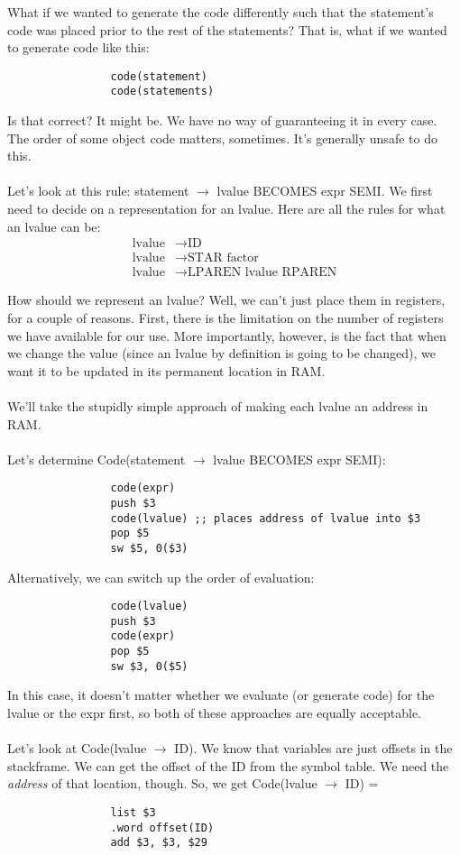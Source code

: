 \documentclass[]{article}
\theoremstyle{definition}
\begin{document}
				What if we wanted to generate the code differently such that the statement's code was placed prior to the rest of the statements? That is, what if we wanted to generate code like this:
				\begin{verbatim}
				code(statement)
				code(statements)
				\end{verbatim}

				Is that correct? It might be. We have no way of guaranteeing it in every case. The order of some object code matters, sometimes. It's generally unsafe to do this.
				\\ \\
				Let's look at this rule: statement $\to$ lvalue BECOMES expr SEMI. We first need to decide on a representation for an lvalue. Here are all the rules for what an lvalue can be:
				\begin{align*}
					\text{lvalue} &\to \text{ID} \\
					\text{lvalue} &\to \text{STAR factor} \\
					\text{lvalue} &\to \text{LPAREN lvalue RPAREN}
				\end{align*}

				How should we represent an lvalue? Well, we can't just place them in registers, for a couple of reasons. First, there is the limitation on the number of registers we have available for our use. More importantly, however, is the fact that when we change the value (since an lvalue by definition is going to be changed), we want it to be updated in its permanent location in RAM.
				\\ \\
				We'll take the stupidly simple approach of making each lvalue an address in RAM.
				\\ \\
				Let's determine Code(statement $\to$ lvalue BECOMES expr SEMI):
				\begin{verbatim}
				code(expr)
				push $3
				code(lvalue) ;; places address of lvalue into $3
				pop $5
				sw $5, 0($3)
				\end{verbatim}

				Alternatively, we can switch up the order of evaluation:
				\begin{verbatim}
				code(lvalue)
				push $3
				code(expr)
				pop $5
				sw $3, 0($5)
				\end{verbatim}

				In this case, it doesn't matter whether we evaluate (or generate code) for the lvalue or the expr first, so both of these approaches are equally acceptable.
				\\ \\
				Let's look at Code(lvalue $\to$ ID). We know that variables are just offsets in the stackframe. We can get the offset of the ID from the symbol table. We need the \emph{address} of that location, though. So, we get Code(lvalue $\to$ ID) =
				\begin{verbatim}
				list $3
				.word offset(ID)
				add $3, $3, $29
				\end{verbatim}
\end{document}
